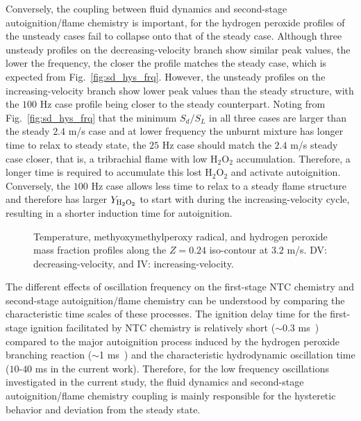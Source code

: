 \documentclass[review,3p,times]{elsarticle}
\begin{document}
\textcolor{Rev1}{Conversely, the coupling between fluid dynamics and second-stage autoignition/flame chemistry is important, for the hydrogen peroxide profiles of the unsteady cases fail to collapse onto that of the steady case.  Although three unsteady profiles on the decreasing-velocity branch show similar peak values, the lower the frequency, the closer the profile matches the steady case, which is expected from Fig.~\ref{fig:sd_hys_frq}.  However, the unsteady profiles on the increasing-velocity branch show lower peak values than the steady structure, with the $100$ Hz case profile being closer to the steady counterpart.  Noting from Fig.~\ref{fig:sd_hys_frq} that the minimum $S_d/S_L$ in all three cases are larger than the steady $2.4$ m/s case and at lower frequency the unburnt mixture has longer time to relax to steady state, the $25$ Hz case should match the $2.4$ m/s steady case closer, that is, a tribrachial flame with low H$_2$O$_2$ accumulation.  Therefore, a longer time is required to accumulate this lost H$_2$O$_2$ and activate autoignition.  Conversely, the $100$ Hz case allows less time to relax to a steady flame structure and therefore has larger $Y_{\rm H_2O_2}$ to start with during the increasing-velocity cycle, resulting in a shorter induction time for autoignition.}

\begin{figure}[t]
  \centering
  \scriptsize
  \resizebox{0.8\textwidth}{!}{}
  \resizebox{0.8\textwidth}{!}{}
  \resizebox{0.8\textwidth}{!}{}
  \normalsize
  \vspace{-0.2in}
  \caption{\textcolor{Rev1}{Temperature, methyoxymethylperoxy radical, and hydrogen peroxide mass fraction profiles along the $Z = 0.24$ iso-contour at $3.2$ m/s.  DV: decreasing-velocity, and IV: increasing-velocity.}}
  \label{fig:ind_frq}
\end{figure}

\textcolor{Rev1}{The different effects of oscillation frequency on the first-stage NTC chemistry and second-stage autoignition/flame chemistry can be understood by comparing the characteristic time scales of these processes.  The ignition delay time for the first-stage ignition facilitated by NTC chemistry is relatively short ($\sim$0.3 ms~\cite{deng15b}) compared to the major autoignition process induced by the hydrogen peroxide branching reaction ($\sim$1 ms~\cite{deng15b}) and the characteristic hydrodynamic oscillation time ($10$-$40$ ms in the current work).  Therefore, for the low frequency oscillations investigated in the current study, the fluid dynamics and second-stage autoignition/flame chemistry coupling is mainly responsible for the hysteretic behavior and deviation from the steady state.}
\end{document}
